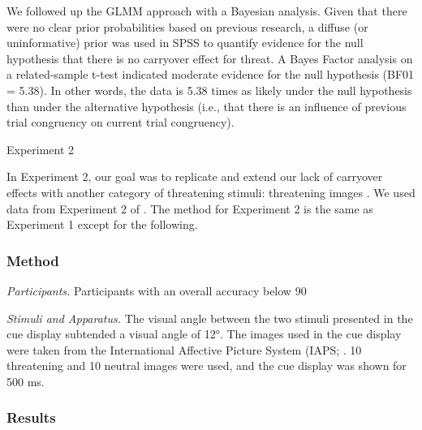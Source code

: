 \documentclass{article}
\begin{document}
	We followed up the GLMM approach with a Bayesian analysis. Given that there were no clear prior probabilities based on previous research, a diffuse (or uninformative) prior was used in SPSS to quantify evidence for the null hypothesis that there is no carryover effect for threat. A Bayes Factor analysis on a related-sample t-test indicated moderate evidence for the null hypothesis (BF01 = 5.38). In other words, the data is 5.38 times as likely under the null hypothesis than under the alternative hypothesis (i.e., that there is an influence of previous trial congruency on current trial congruency).



	Experiment 2



	In Experiment 2, our goal was to replicate and extend our lack of carryover effects with another category of threatening stimuli: threatening images \autocite{Lang2008}. We used data from Experiment 2 of \autocite{Carlson2020}. The method for Experiment 2 is the same as Experiment 1 except for the following.



	\subsubsection{Method}



	\emph{Participants. }Participants with an overall accuracy below 90%



	\emph{Stimuli and Apparatus. }The visual angle between the two stimuli presented in the cue display subtended a visual angle of 12°. The images used in the cue display were taken from the International Affective Picture System (IAPS; \autocite{Lang2008}. 10 threatening and 10 neutral images were used, and the cue display was shown for 500 ms.



	\subsubsection{Results}
\end{document}
